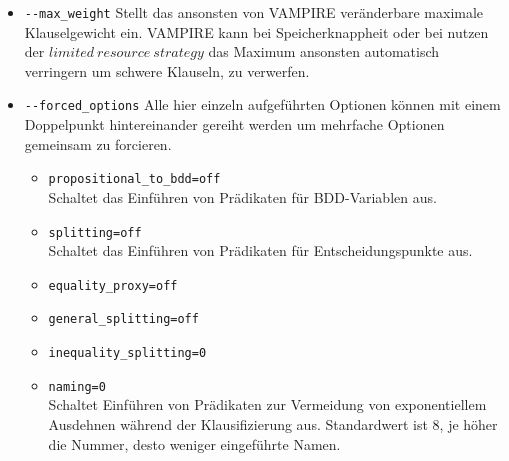 \documentclass{article}
\begin{document}
\begin{itemize}
\item \verb|--max_weight| \label{arg:maxweight}
Stellt das ansonsten von VAMPIRE veränderbare maximale Klauselgewicht ein. VAMPIRE kann bei Speicherknappheit oder bei nutzen der $ limited~resource~strategy $ das Maximum ansonsten automatisch verringern um schwere Klauseln, zu verwerfen.

\item \verb|--forced_options| \label{arg:forcedoptions}
Alle hier einzeln aufgeführten Optionen können mit einem Doppelpunkt hintereinander gereiht werden um mehrfache Optionen gemeinsam zu forcieren. 
\begin{itemize}
	\item \verb|propositional_to_bdd=off| \\
	Schaltet das Einführen von Prädikaten für BDD-Variablen aus.
	\item \verb|splitting=off| \\
	Schaltet das Einführen von Prädikaten für Entscheidungspunkte aus.
	\item \verb|equality_proxy=off|
	\item \verb|general_splitting=off|
	\item \verb|inequality_splitting=0|
	\item \verb|naming=0| \\
	Schaltet Einführen von Prädikaten zur Vermeidung von exponentiellem Ausdehnen während der Klausifizierung aus.
	Standardwert ist 8, je höher die Nummer, desto weniger eingeführte Namen.\\
\end{itemize}


\end{itemize}
\end{document}

